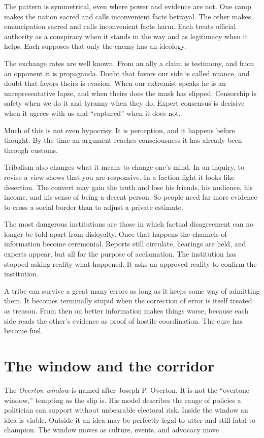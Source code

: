 \documentclass[12pt,a4paper]{book}
\begin{document}
The pattern is symmetrical, even where power and evidence are not. One camp makes the nation sacred and calls inconvenient facts betrayal. The other makes emancipation sacred and calls inconvenient facts harm. Each treats official authority as a conspiracy when it stands in the way and as legitimacy when it helps. Each supposes that only the enemy has an ideology.

The exchange rates are well known. From an ally a claim is testimony, and from an opponent it is propaganda. Doubt that favors our side is called nuance, and doubt that favors theirs is evasion. When our extremist speaks he is an unrepresentative lapse, and when theirs does the mask has slipped. Censorship is safety when we do it and tyranny when they do. Expert consensus is decisive when it agrees with us and ``captured'' when it does not.

Much of this is not even hypocrisy. It is perception, and it happens before thought. By the time an argument reaches consciousness it has already been through customs.

Tribalism also changes what it means to change one's mind. In an inquiry, to revise a view shows that you are responsive. In a faction fight it looks like desertion. The convert may gain the truth and lose his friends, his audience, his income, and his sense of being a decent person. So people need far more evidence to cross a social border than to adjust a private estimate.

The most dangerous institutions are those in which factual disagreement can no longer be told apart from disloyalty. Once that happens the channels of information become ceremonial. Reports still circulate, hearings are held, and experts appear, but all for the purpose of acclamation. The institution has stopped asking reality what happened. It asks an approved reality to confirm the institution.

A tribe can survive a great many errors as long as it keeps some way of admitting them. It becomes terminally stupid when the correction of error is itself treated as treason. From then on better information makes things worse, because each side reads the other's evidence as proof of hostile coordination. The cure has become fuel.

\section{The window and the corridor}

The \emph{Overton window} is named after Joseph P. Overton. It is not the ``overtone window,'' tempting as the slip is. His model describes the range of policies a politician can support without unbearable electoral risk. Inside the window an idea is viable. Outside it an idea may be perfectly legal to utter and still fatal to champion. The window moves as culture, events, and advocacy move \cite{MackinacOvertonWindow}.
\end{document}
